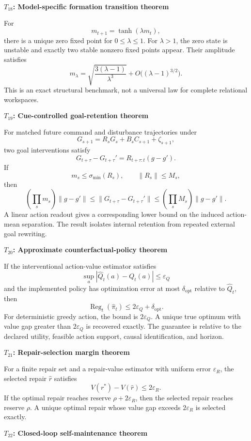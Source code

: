 \documentclass[11pt,letterpaper]{article}
\newcommand{\subtopic}[1]{%
 \vspace{0.45em}
 {\bfseries\color{AccentColor} #1\par}
}
\theoremstyle{plain}
\theoremstyle{definition}
\begin{document}
\subtopic{\(T_{18}\): Model-specific formation transition theorem }

For
\[
m_{t+1}=\tanh(\lambda m_t),
\]
there is a unique zero fixed point for \(0\leq\lambda\leq1\). For
\(\lambda>1\), the zero state is unstable and exactly two stable nonzero fixed
points appear. Their amplitude satisfies
\[
\boxed{
m_\lambda
=
\sqrt{\frac{3(\lambda-1)}{\lambda^3}}
+
O\bigl((\lambda-1)^{3/2}\bigr).
}
\]
This is an exact structural benchmark, not a universal law for complete
relational workspaces.

\subtopic{\(T_{19}\): Cue-controlled goal-retention theorem }

For matched future command and disturbance trajectories under
\[
G_{s+1}=R_sG_s+B_sC_{s+1}+\zeta_{s+1},
\]
two goal interventions satisfy
\[
\boxed{
G_{t+\tau}-G_{t+\tau}'
=
R_{t+\tau:t}(g-g').
}
\]
If
\[
m_s\leq\sigma_{\min}(R_s),
\qquad
\|R_s\|\leq M_s,
\]
then
\[
\boxed{
\left(\prod_s m_s\right)\|g-g'\|
\leq
\|G_{t+\tau}-G_{t+\tau}'\|
\leq
\left(\prod_s M_s\right)\|g-g'\|.
}
\]
A linear action readout gives a corresponding lower bound on the induced
action-mean separation. The result isolates internal retention from repeated
external goal rewriting.

\subtopic{\(T_{20}\): Approximate counterfactual-policy theorem }

If the interventional action-value estimator satisfies
\[
\sup_a|\widehat Q_t(a)-Q_t(a)|\leq\varepsilon_Q
\]
and the implemented policy has optimization error at most
\(\delta_{\mathrm{opt}}\) relative to \(\widehat Q_t\), then
\[
\boxed{
\operatorname{Reg}_t(\widehat\pi_t)
\leq
2\varepsilon_Q+\delta_{\mathrm{opt}}.
}
\]
For deterministic greedy action, the bound is \(2\varepsilon_Q\). A unique
true optimum with value gap greater than \(2\varepsilon_Q\) is recovered
exactly. The guarantee is relative to the declared utility, feasible action
support, causal identification, and horizon.

\subtopic{\(T_{21}\): Repair-selection margin theorem }

For a finite repair set and a repair-value estimator with uniform error
\(\varepsilon_R\), the selected repair \(\widehat r\) satisfies
\[
\boxed{
V(r^*)-V(\widehat r)
\leq
2\varepsilon_R.
}
\]
If the optimal repair reaches reserve \(\rho+2\varepsilon_R\), then the selected
repair reaches reserve \(\rho\). A unique optimal repair whose value gap
exceeds \(2\varepsilon_R\) is selected exactly.

\subtopic{\(T_{22}\): Closed-loop self-maintenance theorem }
\end{document}
